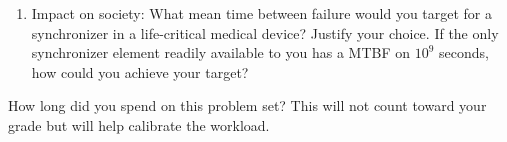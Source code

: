 \documentclass{ps}
\begin{document}
\begin{enumerate}
\item Impact on society: What mean time between failure would you
  target for a synchronizer in a life-critical medical device?
  Justify your choice.  If the only synchronizer element readily
  available to you has a MTBF on \(10^9\) seconds, how could you
  achieve your target?
  \begin{solution}
  \end{solution}
\end{enumerate}

How long did you spend on this problem set?  This will not count
toward your grade but will help calibrate the workload.
\begin{solution}
\end{solution}
\end{document}
